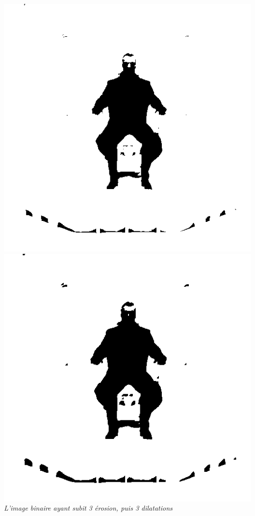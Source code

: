 \documentclass[a4paper,11pt]{article}
\begin{document}
\begin{center}
\includegraphics[scale=0.33]{weskerbinaireeee.png}
\includegraphics[scale=0.33]{weskerbinaireeeeddd.png}\\
\textit{L'image binaire ayant subit 3 érosion, puis 3 dilatations}
\end{center}
\end{document}
